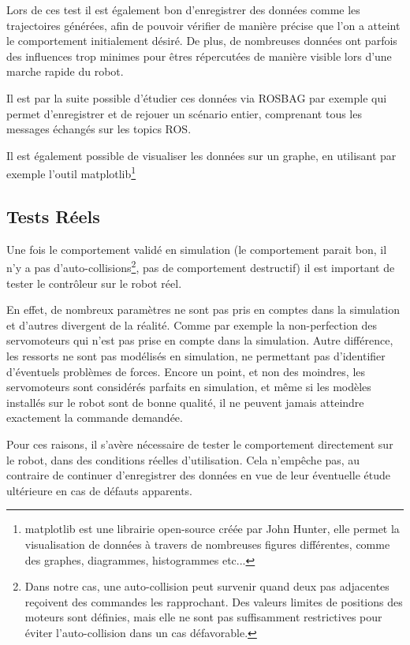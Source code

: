 \documentclass{tnreport}
\begin{document}
Lors de ces test il est également bon d'enregistrer des données comme les trajectoires générées, afin de pouvoir vérifier de manière précise que l'on a atteint le comportement initialement désiré. De plus, de nombreuses données ont parfois des influences trop minimes pour êtres répercutées de manière visible lors d'une marche rapide du robot. 

Il est par la suite possible d'étudier ces données via ROSBAG par exemple qui permet d'enregistrer et de rejouer un scénario entier, comprenant tous les messages échangés sur les topics ROS. 

Il est également possible de visualiser les données sur un graphe, en utilisant par exemple l'outil matplotlib\footnote{matplotlib est une librairie open-source créée par John Hunter, elle permet la visualisation de données à travers de nombreuses figures différentes, comme des graphes, diagrammes, histogrammes etc...}

\subsection{Tests Réels}

Une fois le comportement validé en simulation (le comportement parait bon, il n'y a pas d'auto-collisions\footnote{Dans notre cas, une auto-collision peut survenir quand deux pas adjacentes reçoivent des commandes les rapprochant. Des valeurs limites de positions des moteurs sont définies, mais elle ne sont pas suffisamment restrictives pour éviter l'auto-collision dans un cas défavorable.}, pas de comportement destructif) il est important de tester le contrôleur sur le robot réel. 

En effet, de nombreux paramètres ne sont pas pris en comptes dans la simulation et d'autres divergent de la réalité. Comme par exemple la non-perfection des servomoteurs qui n'est pas prise en compte dans la simulation. Autre différence, les ressorts ne sont pas modélisés en simulation, ne permettant pas d'identifier d'éventuels problèmes de forces. Encore un point, et non des moindres, les servomoteurs sont considérés parfaits en simulation, et même si les modèles installés sur le robot sont de bonne qualité, il ne peuvent jamais atteindre exactement la commande demandée. 

Pour ces raisons, il s'avère nécessaire de tester le comportement directement sur le robot, dans des conditions réelles d'utilisation. Cela n'empêche pas, au contraire de continuer d'enregistrer des données en vue de leur éventuelle étude ultérieure en cas de défauts apparents. 
\end{document}
